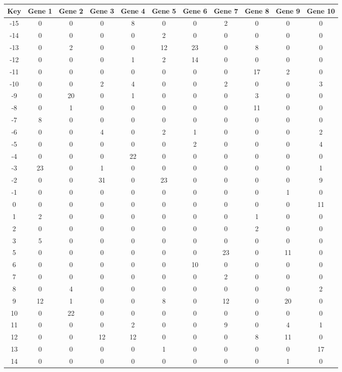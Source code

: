 \begin{tabular}{|c|c|c|c|c|c|c|c|c|c|c|}
\hline
Key & Gene 1 & Gene 2 & Gene 3 & Gene 4 & Gene 5 & Gene 6 & Gene 7 & Gene 8 & Gene 9 & Gene 10 \\
\hline
-15 & 0 & 0 & 0 & 8 & 0 & 0 & 2 & 0 & 0 & 0 \\
-14 & 0 & 0 & 0 & 0 & 2 & 0 & 0 & 0 & 0 & 0 \\
-13 & 0 & 2 & 0 & 0 & 12 & 23 & 0 & 8 & 0 & 0 \\
-12 & 0 & 0 & 0 & 1 & 2 & 14 & 0 & 0 & 0 & 0 \\
-11 & 0 & 0 & 0 & 0 & 0 & 0 & 0 & 17 & 2 & 0 \\
-10 & 0 & 0 & 2 & 4 & 0 & 0 & 2 & 0 & 0 & 3 \\
-9 & 0 & 20 & 0 & 1 & 0 & 0 & 0 & 3 & 0 & 0 \\
-8 & 0 & 1 & 0 & 0 & 0 & 0 & 0 & 11 & 0 & 0 \\
-7 & 8 & 0 & 0 & 0 & 0 & 0 & 0 & 0 & 0 & 0 \\
-6 & 0 & 0 & 4 & 0 & 2 & 1 & 0 & 0 & 0 & 2 \\
-5 & 0 & 0 & 0 & 0 & 0 & 2 & 0 & 0 & 0 & 4 \\
-4 & 0 & 0 & 0 & 22 & 0 & 0 & 0 & 0 & 0 & 0 \\
-3 & 23 & 0 & 1 & 0 & 0 & 0 & 0 & 0 & 0 & 1 \\
-2 & 0 & 0 & 31 & 0 & 23 & 0 & 0 & 0 & 0 & 9 \\
-1 & 0 & 0 & 0 & 0 & 0 & 0 & 0 & 0 & 1 & 0 \\
0 & 0 & 0 & 0 & 0 & 0 & 0 & 0 & 0 & 0 & 11 \\
1 & 2 & 0 & 0 & 0 & 0 & 0 & 0 & 1 & 0 & 0 \\
2 & 0 & 0 & 0 & 0 & 0 & 0 & 0 & 2 & 0 & 0 \\
3 & 5 & 0 & 0 & 0 & 0 & 0 & 0 & 0 & 0 & 0 \\
5 & 0 & 0 & 0 & 0 & 0 & 0 & 23 & 0 & 11 & 0 \\
6 & 0 & 0 & 0 & 0 & 0 & 10 & 0 & 0 & 0 & 0 \\
7 & 0 & 0 & 0 & 0 & 0 & 0 & 2 & 0 & 0 & 0 \\
8 & 0 & 4 & 0 & 0 & 0 & 0 & 0 & 0 & 0 & 2 \\
9 & 12 & 1 & 0 & 0 & 8 & 0 & 12 & 0 & 20 & 0 \\
10 & 0 & 22 & 0 & 0 & 0 & 0 & 0 & 0 & 0 & 0 \\
11 & 0 & 0 & 0 & 2 & 0 & 0 & 9 & 0 & 4 & 1 \\
12 & 0 & 0 & 12 & 12 & 0 & 0 & 0 & 8 & 11 & 0 \\
13 & 0 & 0 & 0 & 0 & 1 & 0 & 0 & 0 & 0 & 17 \\
14 & 0 & 0 & 0 & 0 & 0 & 0 & 0 & 0 & 1 & 0 \\
\hline
\end{tabular}